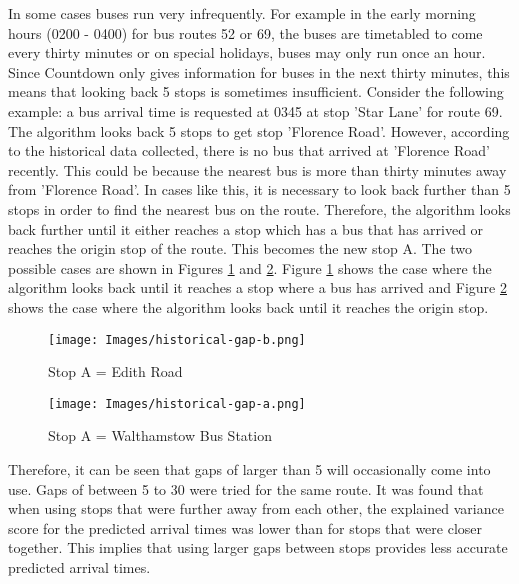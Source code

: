 In some cases buses run very infrequently. For example in the early morning hours (0200 - 0400) for bus routes 52 or 69, the buses are timetabled to come every thirty minutes or on special holidays, buses may only run once an hour. Since Countdown only gives information for buses in the next thirty minutes, this means that looking back 5 stops is sometimes insufficient. Consider the following example: a bus arrival time is requested at 0345 at stop 'Star Lane' for route 69. The algorithm looks back 5 stops to get stop 'Florence Road'. However, according to the historical data collected, there is no bus that arrived at 'Florence Road' recently. This could be because the nearest bus is more than thirty minutes away from 'Florence Road'. In cases like this, it is necessary to look back further than 5 stops in order to find the nearest bus on the route. Therefore, the algorithm looks back further until it either reaches a stop which has a bus that has arrived or reaches the origin stop of the route. This becomes the new stop A. The two possible cases are shown in Figures \ref{fig:bigger-gap-a} and \ref{fig:bigger-gap-b}. Figure \ref{fig:bigger-gap-a} shows the case where the algorithm looks back until it reaches a stop where a bus has arrived and Figure \ref{fig:bigger-gap-b} shows the case where the algorithm looks back until it reaches the origin stop. 

\begin{figure}[H]
\begin{center}
    \texttt{[image: Images/historical-gap-b.png]}
    \caption{Stop A = Edith Road}
    \label{fig:bigger-gap-a}
\end{center}
\end{figure}

\begin{figure}[H]
\begin{center}
    \texttt{[image: Images/historical-gap-a.png]}
    \caption{Stop A = Walthamstow Bus Station}
    \label{fig:bigger-gap-b}
\end{center}
\end{figure}

Therefore, it can be seen that gaps of larger than 5 will occasionally come into use. Gaps of between 5 to 30 were tried for the same route. It was found that when using stops that were further away from each other, the explained variance score for the predicted arrival times was lower than for stops that were closer together. This implies that using larger gaps between stops provides less accurate predicted arrival times. \\


